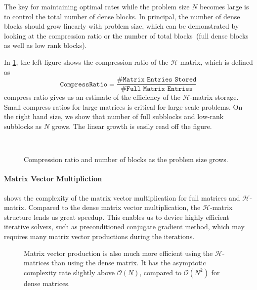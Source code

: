 \documentclass[10pt,a4paper]{article}
\theoremstyle{definition}
\begin{document}
The key for maintaining optimal rates while the problem size $N$ becomes large is to control the total number of dense blocks. In principal, the number of dense blocks should grow linearly with problem size, which can be demonstrated by looking at the compression ratio or the number of total blocks~(full dense blocks as well as low rank blocks). 


In \cref{fig:compress}, the left figure shows the compression ratio of the $\mathcal{H}$-matrix, which is defined as
\begin{equation}
\texttt{CompressRatio}=\frac{\#\texttt{Matrix Entries Stored}}{\#\texttt{Full Matrix Entries}}
\end{equation}
compress ratio gives us an estimate of the efficiency of the $\mathcal{H}$-matrix storage. Small compress ratios for large matrices is critical for large scale problems. On the right hand size, we show that number of full subblocks and low-rank subblocks as $N$ grows. The linear growth is easily read off the figure. 

\begin{figure}[htpb]
\centering
\scalebox{0.4}{}~
\scalebox{0.4}{}~
\caption{Compression ratio and number of blocks as the problem size grows.}
\label{fig:compress}
\end{figure}



\paragraph{Matrix Vector Multipliction}

 shows the complexity of the matrix vector multiplication for full matrices and $\mathcal{H}$-matrix. Compared to the dense matrix vector multiplication, the $\mathcal{H}$-matrix structure lends us great speedup. This enables us to device highly efficient iterative solvers, such as preconditioned conjugate gradient method, which may requires many matrix vector productions during the iterations.  

\begin{figure}[htpb]
\centering
\scalebox{0.6}{}
\caption{Matrix vector production is also much more efficient using the $\mathcal{H}$-matrices than using the dense matrix. It has the asymptotic complexity rate slightly above $\mathcal{O}(N)$, compared to $\mathcal{O}(N^2)$ for dense matrices.}
\label{fig:matvec}
\end{figure}
\end{document}
